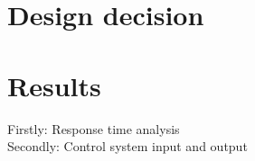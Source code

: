 \section{Design decision}

\section{Results}
Firstly: Response time analysis\\
Secondly: Control system input and output










%

